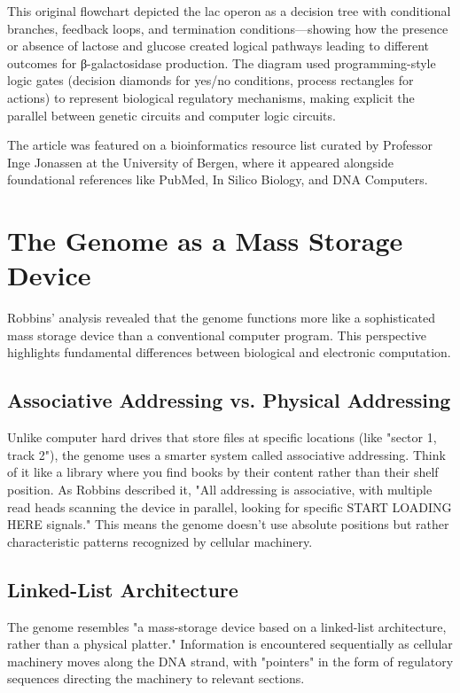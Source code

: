 \documentclass[11pt]{article}
\begin{document}
This original flowchart depicted the lac operon as a decision tree with conditional branches, feedback loops, and termination conditions—showing how the presence or absence of lactose and glucose created logical pathways leading to different outcomes for β-galactosidase production. The diagram used programming-style logic gates (decision diamonds for yes/no conditions, process rectangles for actions) to represent biological regulatory mechanisms, making explicit the parallel between genetic circuits and computer logic circuits.

The article was featured on a bioinformatics resource list curated by Professor Inge Jonassen at the University of Bergen, where it appeared alongside foundational references like PubMed, In Silico Biology, and DNA Computers.

\section{The Genome as a Mass Storage Device}

Robbins' analysis revealed that the genome functions more like a sophisticated mass storage device than a conventional computer program. This perspective highlights fundamental differences between biological and electronic computation.

\subsection{Associative Addressing vs. Physical Addressing}

Unlike computer hard drives that store files at specific locations (like "sector 1, track 2"), the genome uses a smarter system called associative addressing. Think of it like a library where you find books by their content rather than their shelf position. As Robbins described it, "All addressing is associative, with multiple read heads scanning the device in parallel, looking for specific START LOADING HERE signals." This means the genome doesn't use absolute positions but rather characteristic patterns recognized by cellular machinery.

\subsection{Linked-List Architecture}

The genome resembles "a mass-storage device based on a linked-list architecture, rather than a physical platter." Information is encountered sequentially as cellular machinery moves along the DNA strand, with "pointers" in the form of regulatory sequences directing the machinery to relevant sections.
\end{document}
